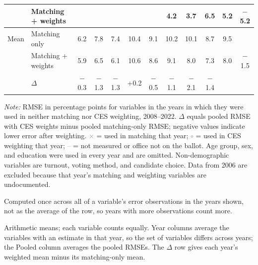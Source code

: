 \begin{table}[!htbp]
{\begin{threeparttable}
\begin{tabular}{llcccccccccc}
 & Matching + weights &  &  &  &  &  & 4.2 & 3.7 & 6.5 & 5.2 & $-$5.2 \\
\midrule
Mean\tnote{b} & Matching only & 6.2 & 7.8 & 7.4 & 10.4 & 9.1 & 10.2 & 10.1 & 8.7 & 9.5 & \\
 & Matching + weights & 5.9 & 6.5 & 6.1 & 10.6 & 8.6 & 9.1 & 8.0 & 7.3 & 8.0 & $-$1.5 \\
 & $\Delta$ & $-$0.3 & $-$1.3 & $-$1.3 & +0.2 & $-$0.5 & $-$1.1 & $-$2.1 & $-$1.4 & & \\
\bottomrule
\end{tabular}
\begin{tablenotes}
\footnotesize
\item \textit{Note:} RMSE in percentage points for variables in the years in which they were used in neither matching nor CES weighting, 2008--2022. $\Delta$ equals pooled RMSE with CES weights minus pooled matching-only RMSE; negative values indicate lower error after weighting. \textcolor{gray}{$\times$} = used in matching that year; \textcolor{gray}{$\circ$} = used in CES weighting that year; \textcolor{gray}{--} = not measured or office not on the ballot. Age group, sex, and education were used in every year and are omitted. Non-demographic variables are turnout, voting method, and candidate choice. Data from 2006 are excluded because that year's matching and weighting variables are undocumented.
\item[a] Computed once across all of a variable's error observations in the years shown, not as the average of the row, so years with more observations count more.
\item[b] Arithmetic means; each variable counts equally. Year columns average the variables with an estimate in that year, so the set of variables differs across years; the Pooled column averages the pooled RMSEs. The $\Delta$ row gives each year's weighted mean minus its matching-only mean.
\end{tablenotes}
\end{threeparttable}%
}
\end{table}